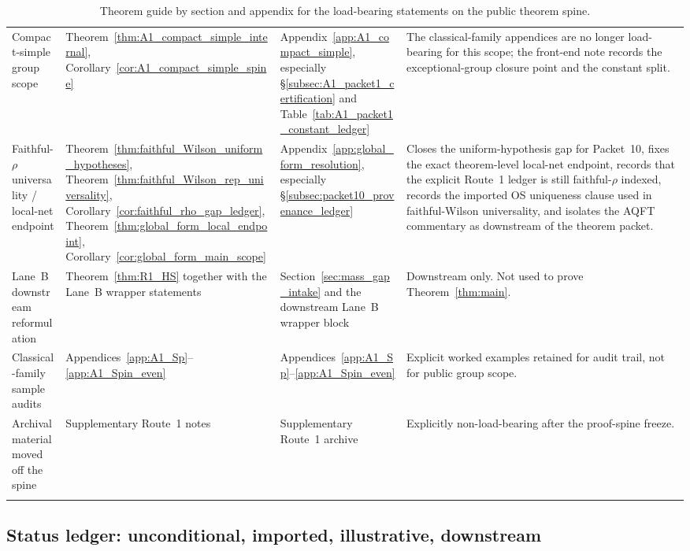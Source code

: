 \begin{longtable}{@{}
>{\RaggedRight\arraybackslash}p{}
>{\RaggedRight\arraybackslash}p{}
>{\RaggedRight\arraybackslash}p{}
>{\RaggedRight\arraybackslash}p{}@{}}
Compact-simple group scope & Theorem~\ref{thm:A1_compact_simple_internal}, Corollary~\ref{cor:A1_compact_simple_spine} & Appendix~\ref{app:A1_compact_simple}, especially \S\ref{subsec:A1_packet1_certification} and Table~\ref{tab:A1_packet1_constant_ledger} & The classical-family appendices are no longer load-bearing for this scope; the front-end note records the exceptional-group closure point and the constant split.\\[0.35em]

Faithful-$\rho$ universality / local-net endpoint & Theorem~\ref{thm:faithful_Wilson_uniform_hypotheses}, Theorem~\ref{thm:faithful_Wilson_rep_universality}, Corollary~\ref{cor:faithful_rho_gap_ledger}, Theorem~\ref{thm:global_form_local_endpoint}, Corollary~\ref{cor:global_form_main_scope} & Appendix~\ref{app:global_form_resolution}, especially \S\ref{subsec:packet10_provenance_ledger} & Closes the uniform-hypothesis gap for Packet~10, fixes the exact theorem-level local-net endpoint, records that the explicit Route~1 ledger is still faithful-$\rho$ indexed, records the imported OS uniqueness clause used in faithful-Wilson universality, and isolates the AQFT commentary as downstream of the theorem packet.\\[0.35em]

Lane~B downstream reformulation & Theorem~\ref{thm:R1_HS} together with the Lane~B wrapper statements & Section~\ref{sec:mass_gap_intake} and the downstream Lane~B wrapper block & Downstream only. Not used to prove Theorem~\ref{thm:main}.\\[0.35em]

Classical-family sample audits & Appendices~\ref{app:A1_Sp}--\ref{app:A1_Spin_even} & Appendices~\ref{app:A1_Sp}--\ref{app:A1_Spin_even} & Explicit worked examples retained for audit trail, not for public group scope.\\[0.35em]

Archival material moved off the spine & Supplementary Route~1 notes & Supplementary Route~1 archive & Explicitly non-load-bearing after the proof-spine freeze.\\
\bottomrule
\caption{Theorem guide by section and appendix for the load-bearing statements on the public theorem spine.}\label{tab:theorem_file_map}
\end{longtable}
\endgroup

\subsection{Status ledger: unconditional, imported, illustrative, downstream}
\label{subsec:status_ledger}

